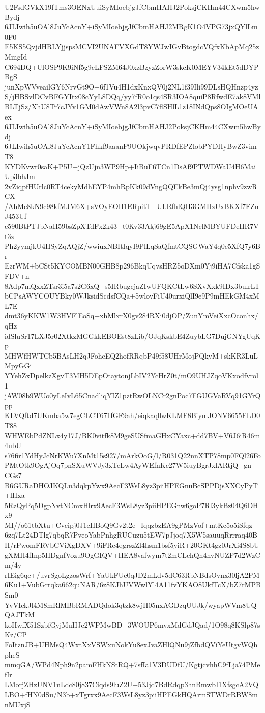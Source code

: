 U2FsdGVkX19fTms3OENxUuiSyMIoebjgJfCbmHAHJ2PoksjCKHm44CXwm5hwBydj
6JLIwih5uOAl8JuYcAcnY+iSyMIoebjgJfCbmHAHJ2MRgK1O4VPG73jxQYlLm0F0
E5KS5QvjdHRLYjjspsMCVI2UNAFVXGdT8YWJwIGvBtogdcVQfxKbApMq25zMmgId
C694DQ+UlOSP9K9iNf5g9cLFSZM64J0xzBzyzZorW3skcK0MEYV34kEt5dDYPBgS
junXpWVveailGY6NrvGt9O+6f1Vu4H1dxKnxQV0j2NL1f39Ili99DLsHQHnzp4yz
S/jHBSvlDCvBFGYItx08cYyL8DQq/yy7fR0o1qs4SR3IOA8quiP8RfwdE7ak8VMl
BLTjSz/XhU8Tr7cJYv1GM0dAwVWn8A2l3pvC7flSHlL1z18INdQps8OIgMOeUAex
6JLIwih5uOAl8JuYcAcnY+iSyMIoebjgJfCbmHAHJ2PoksjCKHm44CXwm5hwBydj
6JLIwih5uOAl8JuYcAcnY1Fhkf9aaanP9UOkjwqvPRDfEPZlobPYDHyBwZ3vimT8
KYDKvwr0saK+P5U+jQzUjn3WP9Hp+IiBuF6TCn1DsAf9PTWDWaU4H6MaiUp3bhJm
2vZiqpfHUrlc0RT4cekyMdhEYP4mhRpKk09dVngQQEkBe3mQj4ysg1nphv9zwRCX
/AhMc8kN9c98kfMJM6X+sVOyEOH1ERpitT+ULRfhlQH3GMHzUxBKXf7FZnJ453Uf
c590BtPTJbNaH59bsZpXTdFx2k43+t0Kv33Akj69gE5ApX1NclMBYUFDeHR7Vt3z
Ph2yymjkU4HSyZqAQjZ/wwiuxNBItIqyI9PlLqSaQfmtCQSGWaY4q0e5XfQ7y6Br
EzrWM+bCSt5KYCOMBN00GHB8p296BkqUqvsHRZ5oDXm0Yj9iHA7Cfska1gSFDV+n
8Adp7mQxxZTsr3i5a7s2G6xQ+s5IRbugcjaZIwUFQKCtLw6SXvXxk9IDx3bulrLT
bCPsAWYCOUYBky0WJksidScdsfCQa+5wlovFiU40urxiQlI9e9P9mHEkGM4xML7E
dmt36yKKW1W3HVFlEoSq+xhMlxrX0gv284RXi0djOP/ZunYmVeiXxcOconhx/qHz
idSluSr17LXJ5r02XtkzMGGkkEBOEst8zLib/OJqKskbE4ZuybLG7DujGNYgUqKp
MHWfHWTCb5BAsLH2qJFoheEQ2hofRRqbP49f58UHrMojPQkyM+skKR3LuLMpyGGi
YYehZxDpelkzXgvT3MH5DEpOtaytonjLbIV2YcHrZ0t/mO9UHJZqoVKxodfvrol1
jAW08b9WUo0yLeIvL65CnadliqYIZ1pztRwOLNCr2gnPoc7FGUGVaRVq91GYrQpp
KLVQftd7UKmba5w7egCLCT671fGF9ah/eiqkaq0wKLMF8BiymJONV6655FLD0T88
WHWEbPdZNLx4y17J/BK0vitfk8M9geSUSfmaGHxCYaxc+dd7BV+V6J6iR46m4ubU
s76fir1YdHyJcNrKWu7XnMt15s927/mArkOoG/l/R031Q22nnXTP78mp0FQl26Fo
PMtOtk9OgAjOq7pnSXuWVJy3xTeLw4AyWEfnKc27W5iuyBgrJxlARtjQ+gn+CGs7
B6GURaDHOJKQLu3dqkpYwx9AecF3WsL8yz3piiHPEGnuBcSPPDjsXXCyPyT+lHxa
5RzQyPq5DgpNvtNCmxHlrx9AecF3WsL8yz3piiHPEGnw6goP7Rl3ykBz04Q6DHx9
MI//o61tbXtu+Cvcipj0J1eHBoQ9Gv2t2e+IqqzbzEA9gPMzVof+mtKc5o5iSfqz
6zq7Lt24DTlg7qbqR7PveoYabPnhgRUCuzu5tEW7pJjoq7X5W5sauuqRrrraq40B
H/rPwomFRVbCViXgDXV+9iFRe4qgrszZl4hsm1bsf5yiR+20GKt4gz0JrXi4S8bU
gXMH4fInp5HDgnfVozu9OgGIQV+HEA8vafwym7t2mCLchQh4hvNUZP7d2WzCm/4y
rIEig6qc+/uvrSgoLgzosWrf+YaUkFUc0qJD2mLdv5dC63RbNBdsOvnx30ljA2PM
6Ku1+VubGrrqka662quNAR/6z8KJhUVWwlYl4A11fvYKAO8UkfTcX/bZ7rMPBSm0
YvVIckJl4M8mRlMBbRMADQdok3qtzk8wjH05nxAGDzqUUJk/wyapWVm8UQQAJTkM
koHwfX51SzbfGyjMuHJe2WPMwBD+3WOUP6mvxMdGdJQad/1O98q8KSlp87sKz/CP
FoItznJB+UHMsQ4WxtXxVSWxuNokYu8exJvaZHlQNu9jZfbdQViYeUtgvWQhpheS
mmqGA/WPd4Nph9n2pamFHkNStRQ+7sfIa1V3DUDfU/KgtjcvhhC9fLja74PMefIr
LMorjZHzUNV1nLdc80j837Ciqds9luZ2U+53Jjd7BdRdqp3hnBmwbI1XfsgcA2VQ
LBO+fHN0dSu/N3b+xTgrxx9AecF3WsL8yz3piiHPEGkHQArmSTWDrRBW8mnMUxjS

